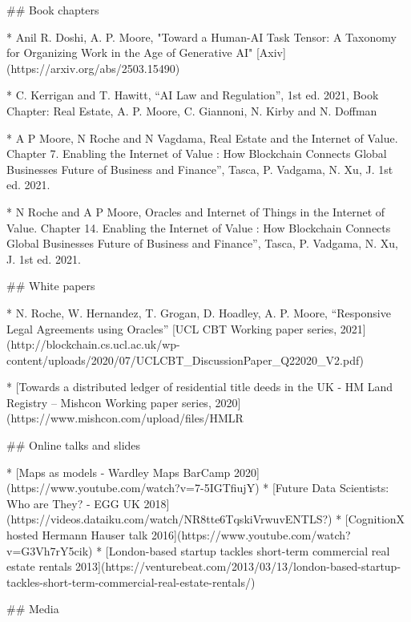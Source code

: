 ## Book chapters 

* Anil R. Doshi, A. P. Moore, "Toward a Human-AI Task Tensor: A Taxonomy for Organizing Work in the Age of Generative AI" [Axiv](https://arxiv.org/abs/2503.15490) 

* C. Kerrigan and T. Hawitt, “AI Law and Regulation”, 1st ed. 2021, Book Chapter: Real Estate, A. P. Moore, C. Giannoni, N. Kirby and N. Doffman

* A P Moore,  N Roche and N Vagdama, Real Estate and the Internet of Value. Chapter 7. Enabling the Internet of Value : How Blockchain Connects Global Businesses Future of Business and Finance”, Tasca, P. Vadgama, N. Xu, J. 1st ed. 2021.

* N Roche and A P Moore, Oracles and Internet of Things in the Internet of Value. Chapter 14. Enabling the Internet of Value : How Blockchain Connects Global Businesses Future of Business and Finance”, Tasca, P. Vadgama, N. Xu, J. 1st ed. 2021.

## White papers 

* N. Roche, W. Hernandez, T. Grogan, D. Hoadley, A. P. Moore, “Responsive Legal Agreements using Oracles” [UCL CBT Working paper series, 2021](http://blockchain.cs.ucl.ac.uk/wp-content/uploads/2020/07/UCLCBT_DiscussionPaper_Q22020_V2.pdf)

* [Towards a distributed ledger of residential title deeds in the UK - HM Land Registry – Mishcon Working paper series, 2020](https://www.mishcon.com/upload/files/HMLR%

## Online talks and slides 

* [Maps as models - Wardley Maps BarCamp 2020](https://www.youtube.com/watch?v=7-5IGTfiujY)
* [Future Data Scientists: Who are They? - EGG UK 2018](https://videos.dataiku.com/watch/NR8tte6TqskiVrwuvENTLS?)
* [CognitionX hosted Hermann Hauser talk 2016](https://www.youtube.com/watch?v=G3Vh7rY5cik)
* [London-based startup tackles short-term commercial real estate rentals 2013](https://venturebeat.com/2013/03/13/london-based-startup-tackles-short-term-commercial-real-estate-rentals/)

## Media 

